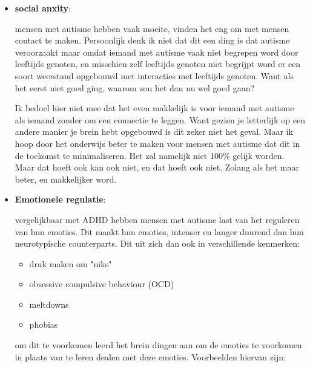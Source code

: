 \documentclass{article}
\begin{document}
                    \begin{itemize}
                    
                        \item \textbf{social anxity}: 

                            mensen met autisme hebben vaak moeite, vinden het eng om met mensen contact te maken. Persoonlijk denk ik niet dat dit een ding is dat autisme veroorzaakt maar omdat iemand met autisme vaak niet begrepen word door leeftijds genoten, en misschien zelf leeftijds genoten niet begrijpt word er een soort weerstand opgebouwd met interacties met leeftijds genoten. Want als het eerst niet goed ging, waarom zou het dan nu wel goed gaan?
                            
                            Ik bedoel hier niet mee dat het even makkelijk is voor iemand met autisme als iemand zonder om een connectie te leggen. Want gezien je letterlijk op een andere manier je brein hebt opgebouwd is dit zeker niet het geval. Maar ik hoop door het onderwijs beter te maken voor mensen met autisme dat dit in de toekomst te minimaliseren. Het zal namelijk niet 100\% gelijk worden. Maar dat hoeft ook kan ook niet, en dat hoeft ook niet. Zolang als het maar beter, en makkelijker word.

                        \item \textbf{Emotionele regulatie}: 

                            vergelijkbaar met ADHD hebben mensen met autisme last van het reguleren van hun emoties. Dit maakt hun emoties, intenser en langer duurend dan hun neurotypische counterparts. Dit uit zich dan ook in verschillende kenmerken:

                            \begin{itemize}
                                \item druk maken om "niks"
                                \item obsessive compulsive behaviour (OCD)
                                \item meltdowns
                                \item phobias
                            \end{itemize}

                            om dit te voorkomen leerd het brein dingen aan om de emoties te voorkomen in plaats van te leren dealen met deze emoties. Voorbeelden hiervan zijn:
                            

\end{itemize}
\end{document}
